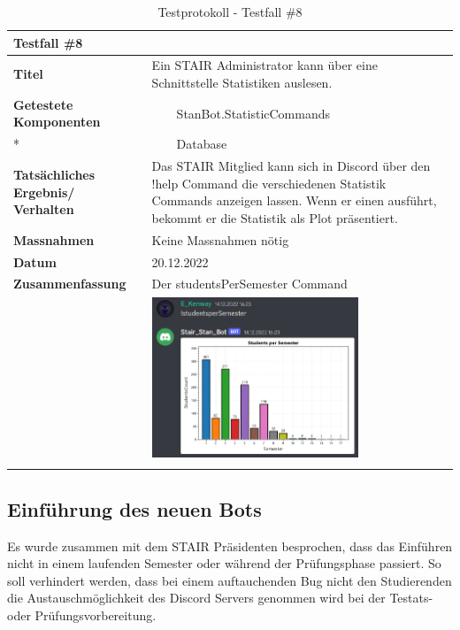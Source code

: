 \documentclass[a4paper, table]{article}
\newcommand{\tabitem}{~~\llap{\textbullet}~~}
\begin{document}
\begin{longtable}[h]{|p{9em}|p{31em}|}
    \hline
    \multicolumn{2}{|l|}{\textbf{Testfall \#8}} \\
    \hline
    \textbf{Titel} & Ein STAIR Administrator kann über eine Schnittstelle Statistiken auslesen. \\
    \hline
    \textbf{Getestete Komponenten} & 
        \tabitem StanBot.StatisticCommands \\ *
     &  \tabitem Database \\
    \hline
    \textbf{Tatsächliches Ergebnis/ Verhalten} & 
        Das STAIR Mitglied kann sich in Discord über den !help Command die verschiedenen Statistik Commands anzeigen lassen. 
        Wenn er einen ausführt, bekommt er die Statistik als Plot präsentiert. \\
    \hline
    \textbf{Massnahmen} & Keine Massnahmen nötig\\
    \hline
    \textbf{Datum} & 20.12.2022\\
    \hline
    \textbf{Zusammenfassung} & 
        Der studentsPerSemester Command \\*
     &  \includegraphics[width=0.7\textwidth]{img/Tests/8_Test_statisticCommand.png} \\
    \hline
    \caption{Testprotokoll - Testfall \#8}
\end{longtable}

\newpage
\subsection{Einführung des neuen Bots}
Es wurde zusammen mit dem STAIR Präsidenten besprochen, dass das Einführen nicht in einem laufenden Semester oder während der Prüfungsphase passiert.
So soll verhindert werden, dass bei einem auftauchenden Bug nicht den Studierenden die Austauschmöglichkeit des Discord Servers genommen wird bei der Testats- oder Prüfungsvorbereitung.
\end{document}
